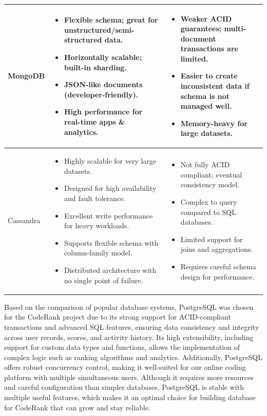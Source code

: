 \begin{longtable}{|p{3cm}|p{6cm}|p{6cm}|}
MongoDB &
\begin{itemize}[leftmargin=*,noitemsep,nolistsep]
  \item Flexible schema; great for unstructured/semi-structured data.
  \item Horizontally scalable; built-in sharding.
  \item JSON-like documents (developer-friendly).
  \item High performance for real-time apps \& analytics.
\end{itemize}
&
\begin{itemize}[leftmargin=*,noitemsep,nolistsep]
  \item Weaker ACID guarantees; multi-document transactions are limited.
  \item Easier to create inconsistent data if schema is not managed well.
  \item Memory-heavy for large datasets.
\end{itemize}
\\ \hline

Cassandra &
\begin{itemize}[leftmargin=*,noitemsep,nolistsep]
  \item Highly scalable for very large datasets.
  \item Designed for high availability and fault tolerance.
  \item Excellent write performance for heavy workloads.
  \item Supports flexible schema with column-family model.
  \item Distributed architecture with no single point of failure.
\end{itemize}
&
\begin{itemize}[leftmargin=*,noitemsep,nolistsep]
  \item Not fully ACID compliant; eventual consistency model.
  \item Complex to query compared to SQL databases.
  \item Limited support for joins and aggregations.
  \item Requires careful schema design for performance.
\end{itemize}
\\ \hline

\end{longtable}

Based on the comparison of popular database systems, PostgreSQL was chosen for the CodeRank project due to its strong support for ACID-compliant transactions and advanced SQL features, ensuring data consistency and integrity across user records, scores, and activity history. Its high extensibility, including support for custom data types and functions, allows the implementation of complex logic such as ranking algorithms and analytics. Additionally, PostgreSQL offers robust concurrency control, making it well-suited for our online coding platform with multiple simultaneous users. Although it requires more resources and careful configuration than simpler databases, PostgreSQL is stable with multiple useful features, which makes it an optimal choice for building database for CodeRank that can grow and stay reliable.